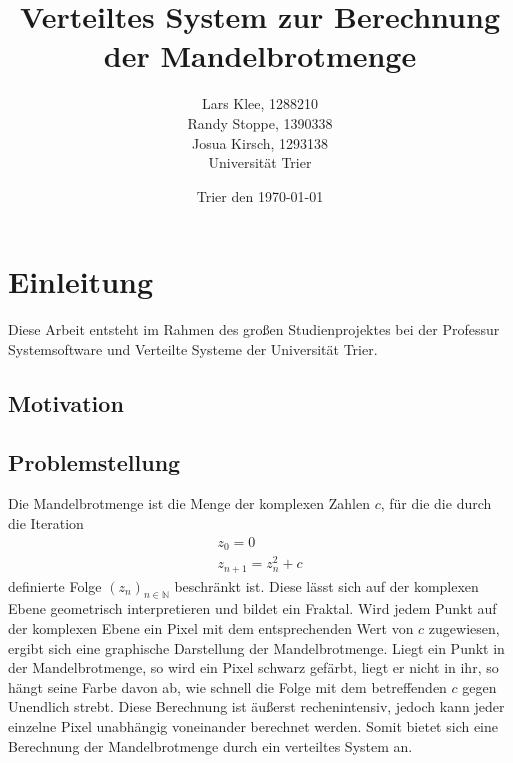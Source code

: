\documentclass[12pt, onecolumn,notitlepage]{scrartcl}
\begin{document}
\title{Verteiltes System zur Berechnung der Mandelbrotmenge}

\author{Lars Klee, 1288210\\Randy Stoppe, 1390338\\Josua Kirsch, 1293138\\Universität Trier}
\date{Trier den \today}

\newcommand{\define}[1]{\color{darkorange}Definition: \color{black}{#1}\\  } 



\maketitle
\tableofcontents


\section{Einleitung}
Diese Arbeit entsteht im Rahmen des großen Studienprojektes bei der Professur Systemsoftware und Verteilte Systeme der Universität Trier.
\subsection{Motivation}
\subsection{Problemstellung}
Die Mandelbrotmenge ist die Menge der komplexen Zahlen $c$, für die die durch die Iteration \begin{gather}
z_{ 0 } = 0  \\
z_{ n+1 } = z_{ n }^{ 2 } + c
\end{gather}
definierte Folge $(z_{ n })_{ n\in \mathbb{N} }$ beschränkt ist. Diese lässt sich auf der komplexen Ebene geometrisch interpretieren und bildet ein Fraktal. Wird jedem Punkt auf der komplexen Ebene ein Pixel mit dem entsprechenden Wert von $c$ zugewiesen, ergibt sich eine graphische Darstellung der Mandelbrotmenge. Liegt ein Punkt in der Mandelbrotmenge, so wird ein Pixel schwarz gefärbt, liegt er nicht in ihr, so hängt seine Farbe davon ab, wie schnell die Folge mit dem betreffenden $c$ gegen Unendlich strebt. Diese Berechnung ist äußerst rechenintensiv, jedoch kann jeder einzelne Pixel unabhängig voneinander berechnet werden. Somit bietet sich eine Berechnung der Mandelbrotmenge durch ein verteiltes System an.
\end{document}
